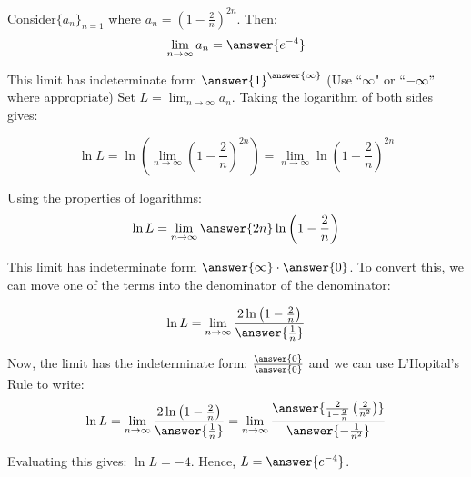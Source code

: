 \documentclass{ximera}
\author{Jim Talamo}
\begin{document}
\begin{exercise}


Consider$\{a_n \}_{n=1}$ where $a_n = \left(1-\frac{2}{n}\right)^{2n}$.  Then:
\[
\lim_{n \to \infty} a_n = \answer{e^{-4}}
\]

\begin{hint}
This limit has indeterminate form $\answer{1}^{\answer{\infty}}$
(Use ``$\infty$" or ``$-\infty"$ where appropriate)
Set $L = \lim_{n \to \infty} a_n$.  Taking the logarithm of both sides gives:

\[
\ln L = \ln  \left( \lim_{n \to \infty} \left(1-\frac{2}{n}\right)^{2n} \right) = \lim_{n \to \infty} \ln \left(1-\frac{2}{n}\right)^{2n} 
\]

Using the properties of logarithms:
\[
\ln L = \lim_{n \to \infty} \answer{2n} \ln \left(1-\frac{2}{n}\right) 
\]
\begin{question}
This limit has indeterminate form $\answer{\infty} \cdot \answer{0}$. To convert this, we can move one of the terms into the denominator of the denominator:

\[
\ln L = \lim_{n \to \infty} \frac{2 \ln \left(1-\frac{2}{n}\right)}{\answer{\frac{1}{n}}} 
\]

\begin{question}
Now, the limit has the indeterminate form: $\frac{\answer{0}}{\answer{0}}$ and we can use L'Hopital's Rule to write:
\[
\ln L = \lim_{n \to \infty} \frac{2 \ln \left(1-\frac{2}{n}\right)}{\answer{\frac{1}{n}}} =  \lim_{n \to \infty} \frac{\answer{\frac{2}{1-\frac{2}{n}} \left( \frac{2}{n^2}\right)}}{\answer{-\frac{1}{n^2}}} 
\]

Evaluating this gives: $\ln L = -4$.  Hence, $L = \answer{e^{-4}}$.



\end{question}
\end{question}
\end{hint}
\end{exercise}
\end{document}

